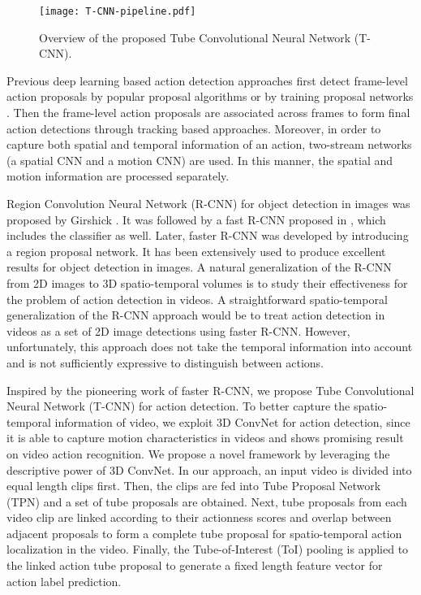 \documentclass[10pt,twocolumn,letterpaper]{article}
\begin{document}
\begin{figure}[t]
	\centering
	\texttt{[image: T-CNN-pipeline.pdf]}
	\caption{Overview of the proposed Tube Convolutional Neural Network (T-CNN).}
	\label{fig:Teaser}
\end{figure}

Previous deep learning based action detection approaches first detect frame-level action proposals by popular proposal algorithms \cite{gkioxari2015finding,weinzaepfel2015learning} or by training proposal networks \cite{peng2016multi}. Then the frame-level action proposals are associated across frames to form final action detections through tracking based approaches. Moreover, in order to capture both spatial and temporal information of an action, two-stream networks (a spatial CNN and a motion CNN) are used. In this manner, the spatial and motion information are processed separately.

Region Convolution Neural Network (R-CNN) for object detection in images was proposed by Girshick \etal \cite{rcnn_Girshick_2014_CVPR}. It was followed by a fast R-CNN proposed in \cite{fast_rcnn_Girshick_2015_ICCV}, which includes the classifier as well. Later, faster R-CNN \cite{faster_rcnn} was developed by introducing a region proposal network. It has been extensively used to produce excellent results for object detection in images.
A natural generalization of the R-CNN from 2D images to 3D spatio-temporal volumes is to study their effectiveness for the problem of action detection in videos. A straightforward spatio-temporal generalization of the R-CNN approach would be to treat action detection in videos as a set of 2D image detections using faster R-CNN. However, unfortunately, this approach does not take the temporal information into account and is not sufficiently expressive to distinguish between actions.

Inspired by the pioneering work of faster R-CNN, we propose Tube Convolutional Neural Network (T-CNN) for action detection. To better capture the spatio-temporal information of video, we exploit 3D ConvNet for action detection, since it is able to capture motion characteristics in videos and shows promising result on video action recognition. We propose a novel framework by leveraging the descriptive power of 3D ConvNet. In our approach, an input video is divided into equal length clips first. Then, the clips are fed into Tube Proposal Network (TPN) and a set of tube proposals are obtained. Next, tube proposals from each video clip are linked according to their actionness scores and overlap between adjacent proposals to form a complete tube proposal for spatio-temporal action localization in the video. Finally, the Tube-of-Interest (ToI) pooling is applied to the linked action tube proposal to generate a fixed length feature vector for action label prediction.
\end{document}

